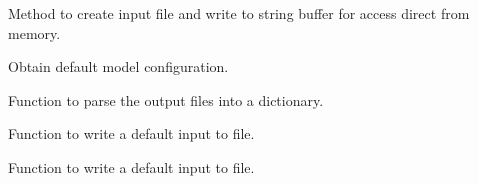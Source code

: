 \documentclass[letterpaper,10pt,english]{sphinxmanual}
\begin{document}
\begin{fulllineitems}
\begin{fulllineitems}
\end{fulllineitems}


\begin{fulllineitems}
\label{\detokenize{bcmdModel:bayescmd.bcmdModel.ModelBCMD.create_initialised_input}}
Method to create input file and write to string buffer for access
direct from memory.

\end{fulllineitems}


\begin{fulllineitems}
\label{\detokenize{bcmdModel:bayescmd.bcmdModel.ModelBCMD.get_defaults}}
Obtain default model configuration.

\end{fulllineitems}


\begin{fulllineitems}
\label{\detokenize{bcmdModel:bayescmd.bcmdModel.ModelBCMD.output_parse}}
Function to parse the output files into a dictionary.

\end{fulllineitems}


\begin{fulllineitems}
\label{\detokenize{bcmdModel:bayescmd.bcmdModel.ModelBCMD.write_default_input}}
Function to write a default input to file.

\end{fulllineitems}


\begin{fulllineitems}
\label{\detokenize{bcmdModel:bayescmd.bcmdModel.ModelBCMD.write_initialised_input}}
Function to write a default input to file.

\end{fulllineitems}


\end{fulllineitems}
\end{document}

